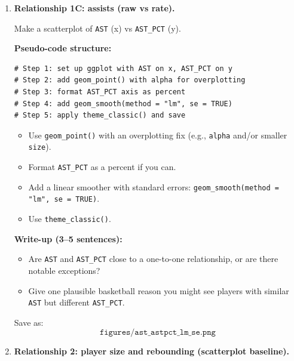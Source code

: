 \documentclass[11pt]{article}
\begin{document}
\begin{enumerate}
  \noindent \textbf{Write-up (3--5 sentences):}
  \begin{itemize}
    \item Does the trend look linear, or do you suspect curvature?
    \item What does the SE ribbon suggest about uncertainty across usage levels?
  \end{itemize}

  \noindent Save as:
  \[
    \texttt{figures/usg\_ts\_eff\_lm\_se.png}
  \]

  \item \textbf{Relationship 1C: assists (raw vs rate).}

  Make a scatterplot of \texttt{AST} (x) vs \texttt{AST\_PCT} (y).

  \textbf{Pseudo-code structure:}
\begin{verbatim}
# Step 1: set up ggplot with AST on x, AST_PCT on y
# Step 2: add geom_point() with alpha for overplotting
# Step 3: format AST_PCT axis as percent
# Step 4: add geom_smooth(method = "lm", se = TRUE)
# Step 5: apply theme_classic() and save
\end{verbatim}

  \begin{itemize}
    \item Use \texttt{geom\_point()} with an overplotting fix (e.g., \texttt{alpha} and/or smaller \texttt{size}).
    \item Format \texttt{AST\_PCT} as a percent if you can.
    \item Add a linear smoother with standard errors: \texttt{geom\_smooth(method = "lm", se = TRUE)}.
    \item Use \texttt{theme\_classic()}.
  \end{itemize}

  \noindent \textbf{Write-up (3--5 sentences):}
  \begin{itemize}
    \item Are \texttt{AST} and \texttt{AST\_PCT} close to a one-to-one relationship, or are there notable exceptions?
    \item Give one plausible basketball reason you might see players with similar \texttt{AST} but different \texttt{AST\_PCT}.
  \end{itemize}

  \noindent Save as:
  \[
    \texttt{figures/ast\_astpct\_lm\_se.png}
  \]

  \item \textbf{Relationship 2: player size and rebounding (scatterplot baseline).}


\end{enumerate}
\end{document}
